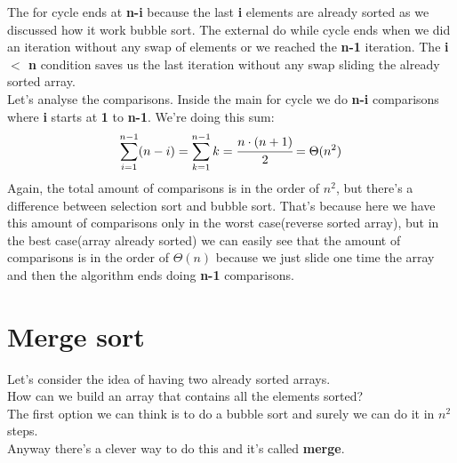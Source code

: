 \documentclass{article}
\begin{document}
The for cycle ends at \textbf{n-i} because the last \textbf{i} elements are already sorted as we discussed how it work bubble sort. The external do while cycle ends when we did an iteration without any swap of elements or we reached the \textbf{n-1} iteration. The \textbf{i $<$ n} condition saves us the last iteration without any swap sliding the already sorted array.\\
Let's analyse the comparisons. Inside the main for cycle we do \textbf{n-i} comparisons where \textbf{i} starts at \textbf{1} to \textbf{n-1}. We're doing this sum:\\
$$\sum_{i=1}^{n-1}(n-i) = \sum_{k=1}^{n-1}k = \cfrac{n \cdot (n+1)}{2} = \Theta(n^2)$$
Again, the total amount of comparisons is in the order of $n^2$, but there's a difference between selection sort and bubble sort. That's because here we have this amount of comparisons only in the worst case(reverse sorted array), but in the best case(array already sorted) we can easily see that the amount of comparisons is in the order of $\Theta(n)$ because we just slide one time the array and then the algorithm ends doing \textbf{n-1} comparisons.

\section{Merge sort}
Let's consider the idea of having two already sorted arrays.\\
How can we build an array that contains all the elements sorted?\\
The first option we can think is to do a bubble sort and surely we can do it in $n^2$ steps. \\
Anyway there's a clever way to do this and it's called \textbf{merge}.


\end{document}

